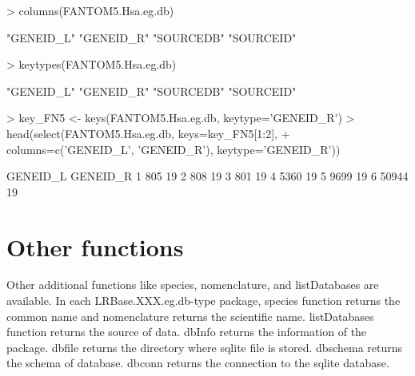 \documentclass[11pt,a4paper,english,arial,twoside]{article}
\begin{document}
\begin{center}
\begin{Schunk}
\begin{Sinput}
> columns(FANTOM5.Hsa.eg.db)
\end{Sinput}
\begin{Soutput}
[1] "GENEID_L" "GENEID_R" "SOURCEDB" "SOURCEID"
\end{Soutput}
\begin{Sinput}
> keytypes(FANTOM5.Hsa.eg.db)
\end{Sinput}
\begin{Soutput}
[1] "GENEID_L" "GENEID_R" "SOURCEDB" "SOURCEID"
\end{Soutput}
\begin{Sinput}
> key_FN5 <- keys(FANTOM5.Hsa.eg.db, keytype='GENEID_R')
> head(select(FANTOM5.Hsa.eg.db, keys=key_FN5[1:2],
+      columns=c('GENEID_L', 'GENEID_R'), keytype='GENEID_R'))
\end{Sinput}
\begin{Soutput}
  GENEID_L GENEID_R
1      805       19
2      808       19
3      801       19
4     5360       19
5     9699       19
6    50944       19
\end{Soutput}
\end{Schunk}
\end{center}

\section{Other functions}

Other additional functions like species, nomenclature, and listDatabases are available. In each LRBase.XXX.eg.db-type package, species function returns the common name and nomenclature returns the scientific name. listDatabases function returns the source of data. dbInfo returns the information of the package. dbfile returns the directory where sqlite file is stored. dbschema returns the schema of database. dbconn returns the connection to the sqlite database.
\end{document}
